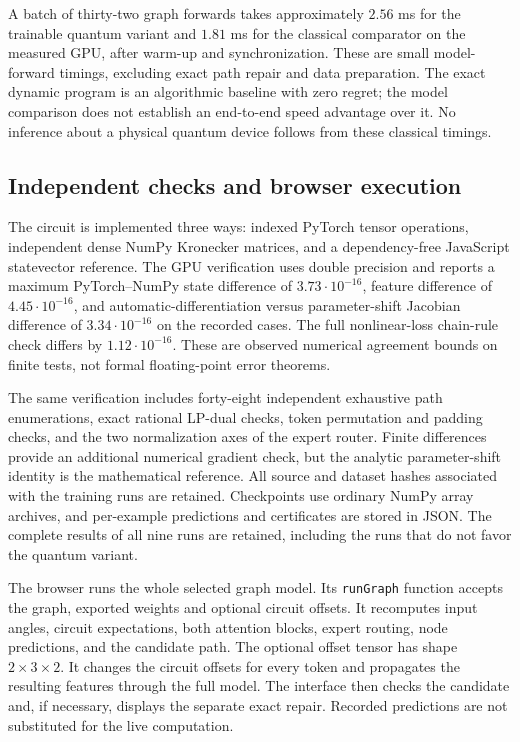 A batch of thirty-two graph forwards takes approximately $2.56$ ms for
the trainable quantum variant and $1.81$ ms for the classical comparator
on the measured GPU, after warm-up and synchronization. These are small
model-forward timings, excluding exact path repair and data preparation.
The exact dynamic program is an algorithmic baseline with zero regret;
the model comparison does not establish an end-to-end speed advantage
over it. No inference about a physical quantum device follows from these
classical timings.

\subsection{Independent checks and browser execution}

The circuit is implemented three ways: indexed PyTorch tensor operations,
independent dense NumPy Kronecker matrices, and a dependency-free JavaScript
statevector reference. The GPU verification uses double precision and
reports a maximum PyTorch--NumPy state difference of $3.73\cdot10^{-16}$,
feature difference of $4.45\cdot10^{-16}$, and automatic-differentiation
versus parameter-shift Jacobian difference of $3.34\cdot10^{-16}$ on
the recorded cases. The full nonlinear-loss chain-rule check differs by
$1.12\cdot10^{-16}$. These are observed numerical agreement bounds on
finite tests, not formal floating-point error theorems.

The same verification includes forty-eight independent exhaustive path
enumerations, exact rational LP-dual checks, token permutation and
padding checks, and the two normalization axes of the expert router.
Finite differences provide an additional numerical gradient check, but
the analytic parameter-shift identity is the mathematical reference.
All source and dataset hashes associated with the training runs are
retained. Checkpoints use ordinary NumPy array archives, and per-example
predictions and certificates are stored in JSON. The complete results
of all nine runs are retained, including the runs that do not favor
the quantum variant.

The browser runs the whole selected graph model. Its
\texttt{runGraph} function accepts the graph, exported weights and optional
circuit offsets. It recomputes input
angles, circuit expectations, both attention blocks, expert routing,
node predictions, and the candidate path. The optional offset tensor
has shape $2\times3\times2$. It changes the circuit offsets for every
token and propagates the resulting features through the full model.
The interface then checks the candidate and, if necessary, displays the
separate exact repair. Recorded predictions are not substituted for the
live computation.

